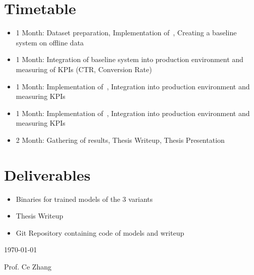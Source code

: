 \documentclass[12pt]{scrartcl}
\begin{document}
\section{Timetable}
%
\begin{itemize}
	\item 1 Month: Dataset preparation, Implementation of~\cite{hierarchical}, Creating a baseline system on offline data
	\item 1 Month: Integration of baseline system into production environment and measuring of KPIs (CTR, Conversion Rate)
	\item 1 Month: Implementation of~\cite{profforce}, Integration into production environment and measuring KPIs
	\item 1 Month: Implementation of~\cite{prod2vec}, Integration into production environment and measuring KPIs
	\item 2 Month: Gathering of results, Thesis Writeup, Thesis Presentation
\end{itemize}
%
\section{Deliverables}
%
\begin{itemize}
	\item Binaries for trained models of the 3 variants
	\item Thesis Writeup
	\item Git Repository containing code of models and writeup
\end{itemize}




\vfill

\hfill \today

\hfill Prof. Ce Zhang
\end{document}
